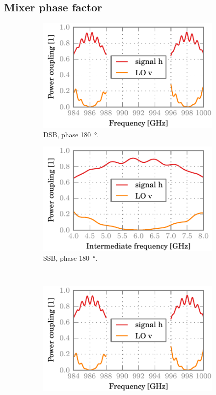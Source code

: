 \subsection{Mixer phase factor}
\begin{figure}[hbtp]
    \centering
    \begin{subfigure}[b]{.5\textwidth}
        \includegraphics{chapter_3/09_badrt_mhcrco_h_dsb}%
        \caption{DSB, phase \SI{180}{\degree}.}
    \end{subfigure}%
    \begin{subfigure}[b]{.5\textwidth}
        \includegraphics{chapter_3/09_badrt_mhcrco_h_ssb}%
        \caption{SSB, phase \SI{180}{\degree}.}
    \end{subfigure}%
    \\
    \begin{subfigure}[b]{.5\textwidth}
        \includegraphics{chapter_3/10_phase_a_h_dsb}%

\end{subfigure}
\end{figure}
